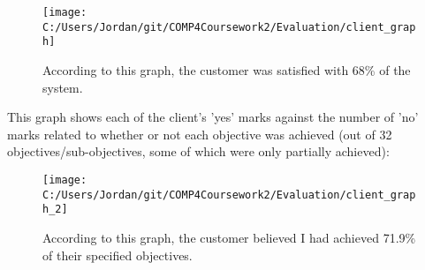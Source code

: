 \begin{figure}[H]
	\texttt{[image: C:/Users/Jordan/git/COMP4Coursework2/Evaluation/client\_graph]}
	\caption{According to this graph, the customer was satisfied with 68\% of the system.}
\end{figure}

This graph shows each of the client's 'yes' marks  against the number of 'no' marks related to whether or not each objective was achieved (out of 32 objectives/sub-objectives, some of which were only partially achieved):

\begin{figure}[H]
	\texttt{[image: C:/Users/Jordan/git/COMP4Coursework2/Evaluation/client\_graph\_2]}
	\caption{According to this graph, the customer believed I had achieved 71.9\% of their specified objectives.}
\end{figure}
